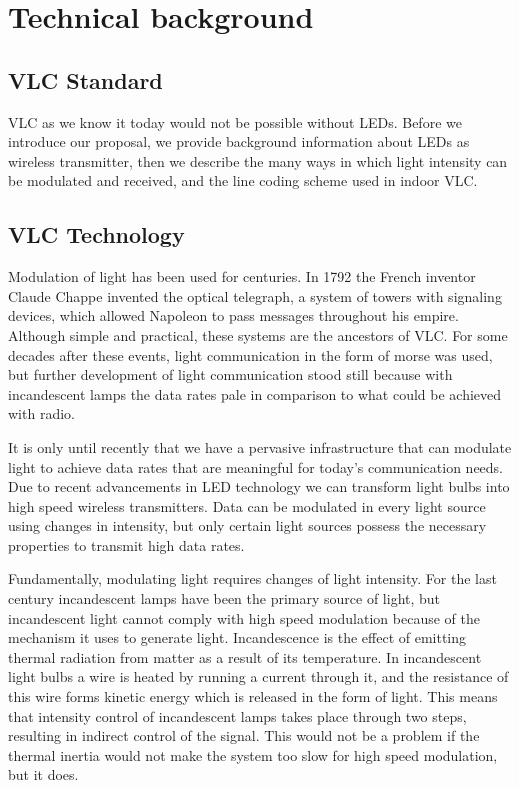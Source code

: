 \chapter{Technical background}
\label{Technical}


\section{VLC Standard}
VLC as we know it today would not be possible without LEDs. Before we introduce
our proposal, we provide background information
about LEDs as wireless transmitter, then we describe the many ways in which
light intensity can be modulated and received, and the line coding scheme used
in indoor VLC.

\section{VLC Technology}

Modulation of light has been used for centuries. In 1792 the French inventor
Claude Chappe invented the optical telegraph, a system of towers with signaling
devices, which allowed Napoleon to pass messages throughout his empire. Although
simple and practical, these systems are the ancestors of VLC. For some decades
after these events, light communication in the form of morse was used, but further
development of light communication stood still because with incandescent lamps
the data rates pale in comparison to what could be achieved with radio.

It is only until recently that we have a pervasive infrastructure that can modulate
light to achieve data rates that are meaningful for today’s communication needs.
Due to recent advancements in LED technology we can transform light bulbs into
high speed wireless transmitters. Data can be modulated in every light source
using changes in intensity, but only certain light sources possess the necessary
properties to transmit high data rates.

Fundamentally, modulating light requires changes of light intensity. For the last
century incandescent lamps have been the primary source of light, but incandescent
light cannot comply with high speed modulation because of the mechanism
it uses to generate light. Incandescence is the effect of emitting thermal radiation
from matter as a result of its temperature. In incandescent light bulbs a wire is
heated by running a current through it, and the resistance of this wire forms kinetic 
energy which is released in the form of light. This means that intensity control
of incandescent lamps takes place through two steps, resulting in indirect control
of the signal. This would not be a problem if the thermal inertia would not make
the system too slow for high speed modulation, but it does.

